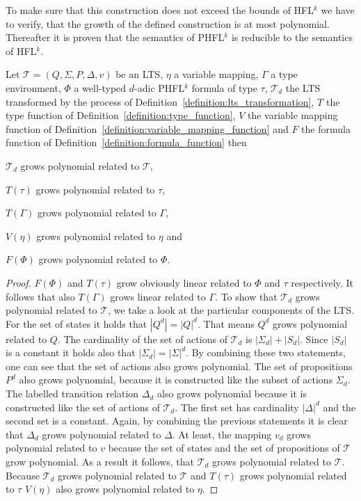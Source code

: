 To make sure that this construction does not exceed the bounds of HFL$^k$ we have to verify, that the growth of the defined construction is at most polynomial. Thereafter it is proven that the semantics of PHFL$^k$ is
reducible to the semantics of HFL$^k$.

\begin{lemma}
\label{lemma:phfl_to_hfl_polynomial}
Let $\mathcal{T} = (Q, \Sigma, P, \Delta, v)$ be an LTS, $\eta$ a variable mapping, $\Gamma$ a type environment, $\Phi$ a well-typed $d$-adic
    PHFL$^k$ formula of type $\tau$, $\mathcal{T}_d$ the LTS transformed by the process of
    Definition~\ref{definition:lts_transformation}, $T$ the type function of Definition~\ref{definition:type_function},
    $V$ the variable mapping function of Definition~\ref{definition:variable_mapping_function}
    and $F$ the formula function of Definition~\ref{definition:formula_function} then 
    \begin{compactitem}
    \item $\mathcal{T}_d$ grows polynomial related to $\mathcal{T}$, 
    \item $T(\tau)$ grows polynomial related to $\tau$,
    \item $T(\Gamma)$ grows polynomial related to $\Gamma$,
    \item $V(\eta)$ grows polynomial related to $\eta$ and
    \item $F(\Phi)$ grows polynomial related to $\Phi$.
    \end{compactitem}
\end{lemma}

\begin{proof}
	$F(\Phi)$ and $T(\tau)$ grow obviously linear related to $\Phi$ and $\tau$ 
	respectively. It follows that also $T(\Gamma)$ grows linear related to $\Gamma$. To show 
	that $\mathcal{T}_d$ grows polynomial related to $\mathcal{T}$, we take a look at the particular 
	components of the LTS. For the set of states it holds that $|Q^d| = |Q|^d$. That means $Q^d$ 
	grows polynomial related to $Q$. The cardinality of the set of actions of $\mathcal{T}_d$ is 
	$|\Sigma_d| + |S_d|$. Since $|S_d|$ is a constant it holds also that $|\Sigma_d| = |\Sigma|^d$. 
	By combining these two statements, one can see that the set of actions also grows polynomial. The set of propositions $P^d$ also grows 
	polynomial, because it is constructed like the subset of actions $\Sigma_d$. The labelled 
	transition relation $\Delta_d$ also grows polynomial because it is constructed like the set of 
	actions of $\mathcal{T}_d$. The first set has cardinality $|\Delta|^d$ and the second set is a 
	constant. Again, by combining the previous statements it is clear that $\Delta_d$ grows polynomial related to $\Delta$. At least, the 
	mapping $v_d$ grows polynomial related to $v$ because the set of states and the set of 
	propositions of $\mathcal{T}$ grow polynomial. As a result it follows, that $
	\mathcal{T}_d$ grows polynomial related to $\mathcal{T}$. Because $\mathcal{T}_d$ grows 
	polynomial related to $\mathcal{T}$ and $T(\tau)$ grows polynomial related to $\tau$  
	$V(\eta)$ also grows polynomial related to $\eta$. 
\end{proof}

